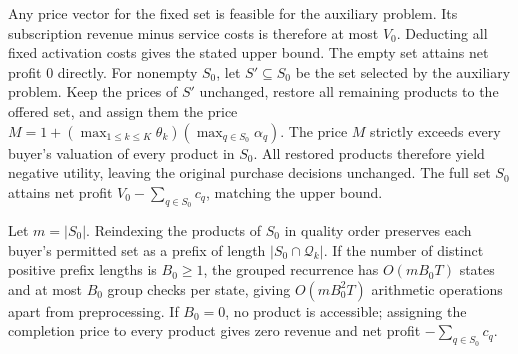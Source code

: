 \begin{IEEEproof}
Any price vector for the fixed set is feasible for the auxiliary problem. Its subscription revenue minus service costs is therefore at most $V_0$. Deducting all fixed activation costs gives the stated upper bound. The empty set attains net profit 0 directly. For nonempty $S_0$, let $S'\subseteq S_0$ be the set selected by the auxiliary problem. Keep the prices of $S'$ unchanged, restore all remaining products to the offered set, and assign them the price $M=1+(\max_{1\le k\le K}\theta_k)(\max_{q\in S_0}\alpha_q)$. The price $M$ strictly exceeds every buyer's valuation of every product in $S_0$. All restored products therefore yield negative utility, leaving the original purchase decisions unchanged. The full set $S_0$ attains net profit $V_0-\sum_{q\in S_0}c_q$, matching the upper bound.

Let $m=|S_0|$. Reindexing the products of $S_0$ in quality order preserves each buyer's permitted set as a prefix of length $|S_0\cap\mathcal Q_k|$. If the number of distinct positive prefix lengths is $B_0\ge1$, the grouped recurrence has $O(mB_0T)$ states and at most $B_0$ group checks per state, giving $O(mB_0^2T)$ arithmetic operations apart from preprocessing. If $B_0=0$, no product is accessible; assigning the completion price to every product gives zero revenue and net profit $-\sum_{q\in S_0}c_q$.%
\end{IEEEproof}
